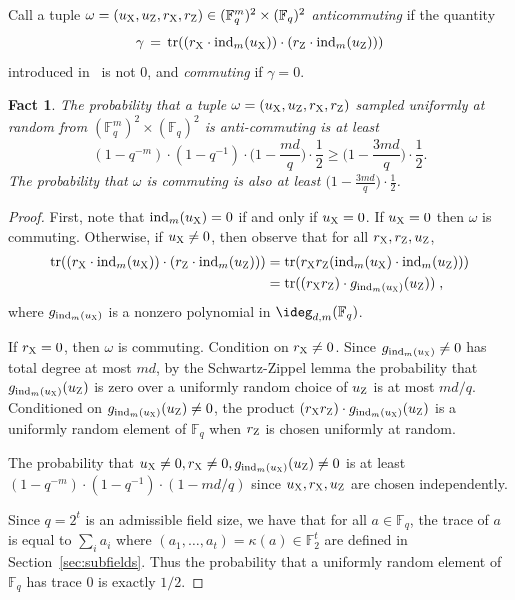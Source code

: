 \documentclass[11pt]{article}
\newtheorem{fact}[theorem]{Fact}
\theoremstyle{definition}
\newcommand{\F}{\ensuremath{\mathbb{F}}}
\newcommand{\ind}{\ensuremath{\mathrm{ind}}}
\DeclareMathOperator{\tr}{tr}
\newcommand{\labelstyle}[1]{\ensuremath{\textsc{#1}}\xspace}
\newcommand{\xpt}{\labelstyle{X}}
\newcommand{\zpt}{\labelstyle{Z}}
\begin{document}
Call a tuple $\omega = (u_\xpt,u_\zpt,r_\xpt,r_\zpt) \in (\F_q^m)^2
\times (\F_q)^2$ \emph{anticommuting} if the quantity 
 \[\gamma\,=\,\tr ((r_\xpt \cdot
\ind_m(u_\xpt)) \cdot (r_\zpt \cdot \ind_m(u_\zpt)))\]
introduced in~ is not $0$, and \emph{commuting} if $\gamma=0$.

\begin{fact}
\label{fact:omega-anticomm-prob}
	The probability that a tuple $\omega= (u_\xpt,u_\zpt,r_\xpt,r_\zpt)$ sampled uniformly at random from $(\F_q^m)^2 \times (\F_q)^2$
	is anti-commuting is at least 
	\[
		(1 - q^{-m}) \cdot (1 - q^{-1}) \cdot \Big (1 - \frac{md}{q} \Big )  \cdot \frac{1}{2} \geq \Big (1 - \frac{3md}{q} \Big ) \cdot \frac{1}{2}.
	\]
	The probability that $\omega$ is commuting is also at least $\Big(1 - \frac{3md}{q} \Big ) \cdot \frac{1}{2}$.
\end{fact}
\begin{proof}
	First, note that $\ind_m(u_\xpt) = 0$ if and only if $u_\xpt = 0$. If $u_\xpt=0$ then $\omega$ is commuting. Otherwise, if $u_\xpt \neq 0$, then observe that for all $r_\xpt, r_\zpt, u_\zpt$,
	\begin{align*}
		\tr( (r_\xpt \cdot \ind_m(u_\xpt)) \cdot (r_\zpt \cdot
                \ind_m(u_\zpt))) &= \tr( r_\xpt r_\zpt (\ind_m(u_\xpt) \cdot \ind_m(u_\zpt))) \\
								&= \tr( (r_\xpt r_\zpt) \cdot g_{\ind_m(u_\xpt)}(u_\zpt))\;,
	\end{align*}
	where $g_{\ind_m(u_\xpt)}$ is a nonzero polynomial in $\ideg_{d,m}(\F_q)$.
	
	If $r_\xpt = 0$, then $\omega$ is commuting. Condition on $r_\xpt \neq 0$.  Since $g_{\ind_m(u_\xpt)}\neq 0$ has total degree at most $md$, by the Schwartz-Zippel lemma the probability that $g_{\ind_m(u_\xpt)}(u_\zpt)$ is zero over a uniformly random choice of $u_\zpt$ is at most $md/q$. Conditioned on $g_{\ind_m(u_\xpt)}(u_\zpt) \neq 0$, the product $(r_\xpt r_\zpt) \cdot g_{\ind_m(u_\xpt)}(u_\zpt)$ is a uniformly random element of $\F_q$ when $r_\zpt$ is chosen uniformly at random. 
	
	The probability that $u_\xpt \neq 0, r_\xpt \neq 0, g_{\ind_m(u_\xpt)}(u_\zpt) \neq 0$ is at least $(1 - q^{-m}) \cdot (1 - q^{-1}) \cdot (1 - md/q)$ since $u_\xpt, r_\xpt, u_\zpt$ are chosen independently.
	
	Since $q = 2^t$ is an admissible field size, we have that for all $a \in \F_q$, the trace of $a$ is equal to $\sum_i a_i$ where $(a_1,\ldots,a_t)=\kappa(a) \in \F_2^t$ are defined in Section~\ref{sec:subfields}. Thus the probability that a uniformly random element of $\F_q$ has trace $0$ is exactly $1/2$. 
\end{proof}
\end{document}
